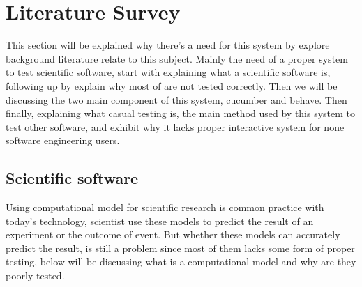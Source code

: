 \chapter{Literature Survey}

This section will be explained why there’s a need for this system by explore background literature relate to this subject. Mainly the need of a proper system to test scientific software, start with explaining what a scientific software is, following up by explain why most of are not tested correctly. Then we will be discussing the two main component of this system, cucumber and behave. Then finally, explaining what casual testing is, the main method used by this system to test other software, and exhibit why it lacks proper interactive system for none software engineering users.

\section{Scientific software}
Using computational model for scientific research is common practice with today’s technology, scientist use these models to predict the result of an experiment or the outcome of event. But whether these models can accurately predict the result, is still a problem since most of them lacks some form of proper testing, below will be discussing what is a computational model and why are they poorly tested.
